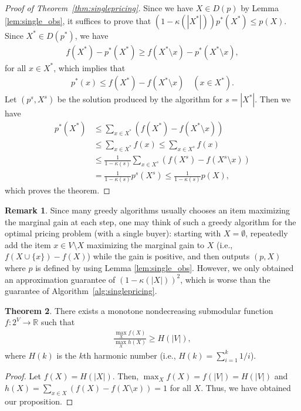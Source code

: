 \documentclass[letterpaper]{article}
\theoremstyle{definition}
\newtheorem{theorem}{Theorem}
\newtheorem{remark}[theorem]{Remark}
\newcommand{\COMM}[2]{{
\begin{CJK}{UTF8}{ipxm}
\ifthenelse{\equal{#1}{TM}}{\color{blue}}{
\ifthenelse{\equal{#1}{YK}}{\color{red}}{
\ifthenelse{\equal{#1}{HS}}{\color{cyan}}{
\ifthenelse{\equal{#1}{KK}}{\color{magenta}}}}}
[#1: #2]
\end{CJK}
}}
\begin{document}
\begin{proof}[Proof of Theorem~\ref{thm:singlepricing}]
Since we have $X \in D(p)$ by Lemma \ref{lem:single_obs},
it suffices to prove that  \((1 - \kappa(|X^*|)) p^*(X^*) \le p(X)\).
Since $X^* \in D(p^*)$, we have
\begin{align}
  f(X^*) - p^*(X^*) \ge f(X^* \setminus x) - p^*(X^* \setminus x),
\end{align}
for all $x \in X^*$, which implies that 
\begin{align}
  p^*(x) \le f(X^*) - f(X^* \setminus x) \quad (x \in X^*).
\end{align}
Let $(p^s, X^s)$ be the solution produced by the algorithm for $s = |X^*|$.
Then we have
\begin{align}
  p^*(X^*) 
  &\le \sum_{x \in X^*} \left( f(X^*) - f(X^* \setminus x) \right) \nonumber \\
  &\le \sum_{x \in X^*} f(x) \le \sum_{x \in X^s} f(x) \nonumber \\
  &\le \frac{1}{1 - \kappa(s)} \sum_{x \in X^s} \left( f(X^s) - f(X^s \setminus x) \right) \nonumber \\
  &= \frac{1}{1 - \kappa(s)} p^s(X^s) \le \frac{1}{1 - \kappa(s)} p(X),
  \end{align}
  which proves the theorem.
\end{proof}

\begin{remark}
Since many greedy algorithms usually chooses an item maximizing the marginal gain at each step, one may think of such a greedy algorithm for the optimal pricing problem (with a single buyer): starting with $X=\emptyset$,
repeatedly add the item $x\in V\setminus X$ maximizing the marginal gain to $X$ (i.e., $f(X\cup\{x\})-f(X)$) while the gain is positive,
and then outputs $(p, X)$ where $p$ is defined by using Lemma \ref{lem:single_obs}. 
However, we only obtained an approximation guarantee of $(1-\kappa(|X|))^2$, which is worse than the guarantee of Algorithm~\ref{alg:singlepricing}. 
\end{remark}

\begin{theorem}
\label{thm:muchworse}
There exists a monotone nondecreasing submodular function $f:2^V\to\mathbb{R}$ such that 
\begin{align}
\frac{\max_{X} f(X)}{\max_{X} h(X)}\ge H(|V|),
\end{align}
where \(H(k)\) is the $k$th harmonic number (i.e., \(H(k)=\sum_{i=1}^k 1/i\)).
\end{theorem}
\begin{proof}
  Let \(f(X)=H(|X|)\).
  Then, \(\max_{X}f(X)=f(|V|)=H(|V|)\) and
  \(h(X)=\sum_{x\in X}(f(X)-f(X\setminus x))=1\) for all \(X\).
 Thus, we have obtained our proposition.
\end{proof}
\end{document}
